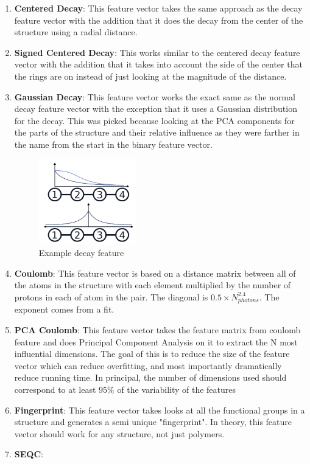 \begin{enumerate}
\item \textbf{Centered Decay}: This feature vector takes the same approach as the decay feature vector with the addition that it does the decay from the center of the structure using a radial distance.

\item \textbf{Signed Centered Decay}: This works similar to the centered decay feature vector with the addition that it takes into account the side of the center that the rings are on instead of just looking at the magnitude of the distance.

\item \textbf{Gaussian Decay}: This feature vector works the exact same as the normal decay feature vector with the exception that it uses a Gaussian distribution for the decay. This was picked because looking at the PCA components for the parts of the structure and their relative influence as they were farther in the name from the start in the binary feature vector.

\begin{figure}[H]
\begin{center}
\includegraphics [width=0.4\textwidth]{decay.png}
\caption{Example decay feature}\label{decay}
\end{center}
\end{figure}

\item \textbf{Coulomb}: This feature vector is based on a distance matrix between all of the atoms in the structure with each element multiplied by the number of protons in each of atom in the pair. The diagonal is $0.5 \times N_{photons}^{2.4}$. The exponent comes from a fit.

\item \textbf{PCA Coulomb}: This feature vector takes the feature matrix from coulomb feature and does Principal Component Analysis on it to extract the N most influential dimensions. The goal of this is to reduce the size of the feature vector which can reduce overfitting, and most importantly dramatically reduce running time. In principal, the number of dimensions used should correspond to at least $95\% $ of the variability of the features

\item \textbf{Fingerprint}: This feature vector takes looks at all the functional groups in a structure and generates a semi unique "fingerprint". In theory, this feature vector should work for any structure, not just polymers.


\item \textbf{SEQC}: 

\end{enumerate}

